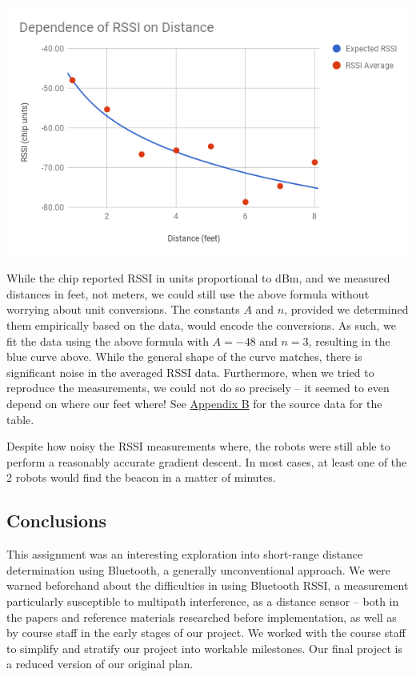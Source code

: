 \documentclass[]{article}
\begin{document}
\includegraphics{rssi-chart.png}

While the chip reported RSSI in units proportional to dBm, and we
measured distances in feet, not meters, we could still use the above
formula without worrying about unit conversions. The constants \(A\) and
\(n\), provided we determined them empirically based on the data, would
encode the conversions. As such, we fit the data using the above formula
with \(A=-48\) and \(n=3\), resulting in the blue curve above. While the
general shape of the curve matches, there is significant noise in the
averaged RSSI data. Furthermore, when we tried to reproduce the
measurements, we could not do so precisely -- it seemed to even depend
on where our feet where! See \protect\hyperlink{rssi-data}{Appendix B}
for the source data for the table.

Despite how noisy the RSSI measurements where, the robots were still
able to perform a reasonably accurate gradient descent. In most cases,
at least one of the 2 robots would find the beacon in a matter of
minutes.

\hypertarget{conclusions}{%
\subsection{Conclusions}\label{conclusions}}

This assignment was an interesting exploration into short-range distance
determination using Bluetooth, a generally unconventional approach. We
were warned beforehand about the difficulties in using Bluetooth RSSI, a
measurement particularly susceptible to multipath interference, as a
distance sensor -- both in the papers and reference materials researched
before implementation, as well as by course staff in the early stages of
our project. We worked with the course staff to simplify and stratify
our project into workable milestones. Our final project is a reduced
version of our original plan.
\end{document}
